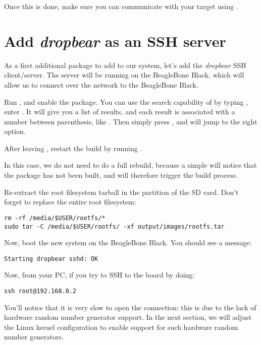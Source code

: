 Once this is done, make sure you can communicate with your target
using .

\section{Add {\em dropbear} as an SSH server}

As a first additional package to add to our system, let's add the {\em
dropbear} SSH client/server. The server will be running on the
BeagleBone Black, which will allow us to connect over the network to
the BeagleBone Black.

Run , and enable the 
package. You can use the search capability of  by
typing \code{/}, enter . It will give you a list of
results, and each result is associated with a number between
parenthesis, like . Then simply press , and
 will jump to the right option.

After leaving , restart the build by running
.

In this case, we do not need to do a full rebuild, because a simple
 will notice that the  package has not been
built, and will therefore trigger the build process.

Re-extract the root filesystem tarball in the  partition
of the SD card. Don't forget to replace the entire root filesystem:

\begin{verbatim}
rm -rf /media/$USER/rootfs/*
sudo tar -C /media/$USER/rootfs/ -xf output/images/rootfs.tar
\end{verbatim}

Now, boot the new system on the BeagleBone Black. You should see a
message:

\begin{verbatim}
Starting dropbear sshd: OK
\end{verbatim}

Now, from your PC, if you try to SSH to the board by doing:

\begin{verbatim}
ssh root@192.168.0.2
\end{verbatim}

You'll notice that it is very slow to open the connection: this is due
to the lack of hardware random number generator support. In the next
section, we will adjust the Linux kernel configuration to enable
support for such hardware random number generators.

